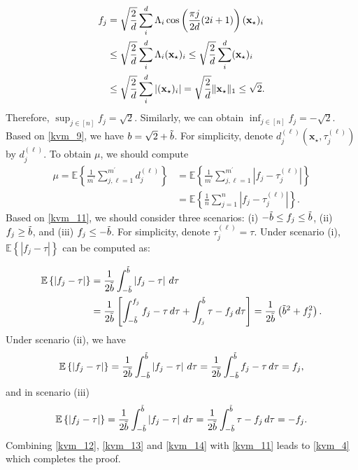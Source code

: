 \documentclass[12pt,draftcls,onecolumn]{IEEEtran}
\def\bt{\Tilde{b}}
\begin{document}
\begin{equation}
\label{kvm_10}
\begin{aligned}
f_j&=\sqrt{\frac{2}{d}}\sum_{i}^{d}\Lambda_{i}\cos\left(\frac{\pi j}{2 d}(2 i+1)\right) (\mbx_{\star})_{i}\\&\leq\sqrt{\frac{2}{d}}\sum_{i}^{d}\Lambda_{i}(\mbx_{\star})_{i}\leq\sqrt{\frac{2}{d}}\sum_{i}^{d}(\mbx_{\star})_{i}\\&\leq\sqrt{\frac{2}{d}}\sum_{i}^{d}|(\mbx_{\star})_{i}|=\sqrt{\frac{2}{d}}\|\mbx_{\star}\|_1\leq\sqrt{2}.
\end{aligned}
\end{equation}
Therefore, $\sup_{j\in[n]}f_j=\sqrt{2}$. Similarly, we can obtain $\inf_{j\in[n]}f_j=-\sqrt{2}$. Based on \eqref{kvm_9}, we have $b=\sqrt{2}+\bt$. For simplicity, denote $d^{(\ell)}_{j}\left(\mathbf{x}_{\star},\tau_{j}^{(\ell)}\right)$ by $d_{j}^{(\ell)}$.
To obtain $\mu$, we should compute %
\begin{equation}
\label{kvm_11}
\begin{aligned}
\mu=\mathbb{E}\left\{\frac{1}{m^{\prime}}\sum_{j,\ell=1}^{m^{\prime}}d_{j}^{(\ell)}\right\}&=\mathbb{E}\left\{\frac{1}{m^{\prime}}\sum_{j,\ell=1}^{m^{\prime}}\left|f_{j}-\tau^{(\ell)}_{j}\right|\right\}\\&=\mathbb{E}\left\{\frac{1}{n}\sum_{j=1}^{n}\left|f_{j}-\tau^{(\ell)}_{j}\right|\right\}.
\end{aligned}
\end{equation}
Based on \eqref{kvm_11}, we should consider three scenarios: (i) $-\bt\leq f_j\leq \bt$, (ii) $f_j\geq\bt$, and (iii) $f_j\leq -\bt$. For simplicity, denote $\tau_{j}^{(\ell)}=\tau$. Under scenario (i), $\mathbb{E}\left\{\left|f_j-\tau\right|\right\}$ can be computed as:

\begin{equation}
\label{kvm_12}
\begin{aligned}
\mathbb{E}\left\{\left|f_j-\tau\right|\right\}&=\frac{1}{2\bt}\int_{-\bt}^{\bt}\left|f_j-\tau\right|\,d\tau\\&=\frac{1}{2\bt}\left[\int_{-\bt}^{f_j}f_j-\tau\,d\tau+\int_{f_j}^{\bt}\tau-f_j\,d\tau\right]=\frac{1}{2\bt}\left(\bt^2+f_{j}^2\right).
\end{aligned}
\end{equation}\normalsize
Under scenario (ii), we have
\begin{equation}
\label{kvm_13}
\mathbb{E}\left\{\left|f_j-\tau\right|\right\}=\frac{1}{2\bt}\int_{-\bt}^{\bt}\left|f_j-\tau\right|\,d\tau=\frac{1}{2\bt}\int_{-\bt}^{\bt}f_j-\tau\,d\tau=f_j,
\end{equation}
and in scenario (iii)
\begin{equation}
\label{kvm_14}
\mathbb{E}\left\{\left|f_j-\tau\right|\right\}=\frac{1}{2\bt}\int_{-\bt}^{\bt}\left|f_j-\tau\right|\,d\tau=\frac{1}{2\bt}\int_{-\bt}^{\bt}\tau-f_j\,d\tau=-f_j.
\end{equation}
Combining \eqref{kvm_12}, \eqref{kvm_13} and \eqref{kvm_14} with \eqref{kvm_11} leads to \eqref{kvm_4} which completes the proof.
\end{document}
